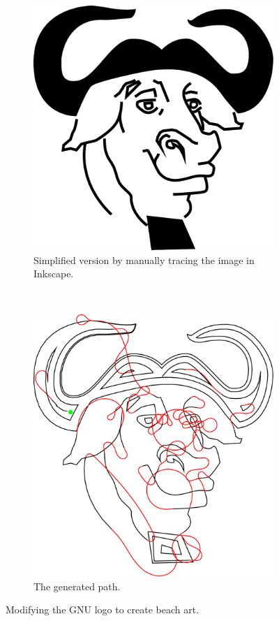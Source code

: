 \begin{figure}[h]
\begin{subfigure}[t]{0.45\textwidth}
	\includegraphics[width=\textwidth]{images/results/gnu/simplified_logo.pdf}
	\caption{Simplified version by manually tracing the image in Inkscape.}
\end{subfigure}\\

\begin{subfigure}[t]{0.95\textwidth}
\centering
	\includegraphics[width=\textwidth]{images/results/gnu/gnu_exported.pdf}
	\caption{The generated path.}
\end{subfigure}
\caption{Modifying the GNU logo to create beach art.}
\end{figure}
